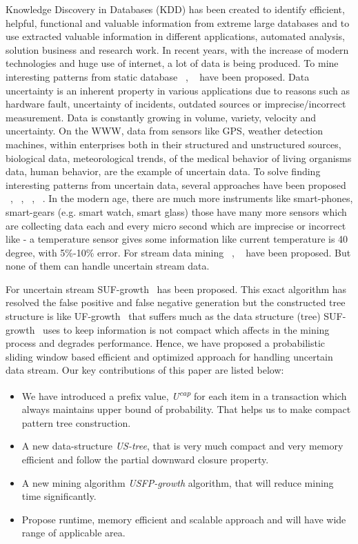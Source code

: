 \documentclass[conference]{IEEEtran}
\begin{document}
Knowledge Discovery in Databases (KDD) has been created to identify efficient, helpful, functional and valuable information from extreme large databases and to use extracted valuable information in different applications, automated analysis, solution business and research work. In recent years, with the increase of modern technologies and huge use of internet, a lot of data is being produced. To mine interesting patterns from static database ~\cite{DBLP:conf/vldb/AgrawalS94}, ~\cite{DBLP:journals/datamine/HanPYM04} have been proposed.
Data uncertainty is an inherent property in various applications due to reasons such as hardware fault, uncertainty of incidents, outdated sources or imprecise/incorrect measurement. Data is constantly growing in volume, variety, velocity and uncertainty. On the WWW, data from sensors like GPS, weather detection machines, within enterprises both in their structured and unstructured sources, biological data, meteorological trends, of the medical behavior of living organisms data, human behavior, are the example of uncertain data. To solve finding interesting patterns from uncertain data, several approaches have been proposed ~\cite{DBLP:journals/tkde/ZhaoYN14}, ~\cite{DBLP:conf/kdd/AggarwalLWW09}, ~\cite{DBLP:conf/pakdd/LeungT13}, ~\cite{DBLP:conf/dasfaa/LeungT12}.
In the modern age, there are much more instruments like smart-phones, smart-gears (e.g. smart watch, smart glass) those have many more sensors which are collecting data each and every micro second which are imprecise or incorrect like - a temperature sensor gives some information like current temperature is 40 degree, with 5\%-10\% error. For stream data mining ~\cite{DBLP:conf/icdm/LeungK06}, ~\cite{DBLP:journals/vldb/CormodeH10} have been proposed. But none of them can handle uncertain stream data.

For uncertain stream SUF-growth~\cite{DBLP:conf/icde/LeungH09} has been proposed. This exact algorithm has resolved the false positive and false negative generation but the constructed tree structure is like UF-growth~\cite{DBLP:conf/kdd/GadeWK04} that suffers much as the data structure (tree) SUF-growth~\cite{DBLP:conf/icde/LeungH09} uses to keep information is not compact which affects in the mining process and degrades performance. Hence, we have proposed a probabilistic sliding window based efficient and optimized approach for handling uncertain data stream.
Our key contributions of this paper are listed below:
\begin{itemize}
  \item We have introduced a prefix value, \emph{U\textsuperscript{cap}} for each item in a transaction which always maintains upper bound of probability. That helps us to make compact pattern tree construction.
  \item A new data-structure \emph{US-tree}, that is very much compact and very memory efficient and follow the partial downward closure property.
  \item A new mining algorithm \emph{USFP-growth} algorithm, that will reduce mining time significantly.
  \item Propose runtime, memory efficient and scalable approach and will have wide range of applicable area.
  \end{itemize}
  
\end{document}

